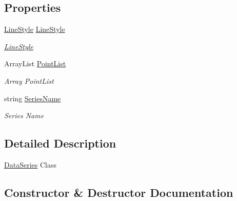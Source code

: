 \subsection*{Properties}
\begin{DoxyCompactItemize}
\item 
\mbox{\hyperlink{class_c_s_i_1_1_library_1_1_plotting_lib_1_1_line_style}{Line\+Style}} \mbox{\hyperlink{class_c_s_i_1_1_library_1_1_plotting_lib_1_1_data_series_aad45f3cd450e9ad86a134f1700a2dc1a}{Line\+Style}}
\begin{DoxyCompactList}\small\item\em \mbox{\hyperlink{class_c_s_i_1_1_library_1_1_plotting_lib_1_1_line_style}{Line\+Style}} \end{DoxyCompactList}\item 
Array\+List \mbox{\hyperlink{class_c_s_i_1_1_library_1_1_plotting_lib_1_1_data_series_a16bc801d66c6e4d327df04933d4f304e}{Point\+List}}
\begin{DoxyCompactList}\small\item\em Array Point\+List \end{DoxyCompactList}\item 
string \mbox{\hyperlink{class_c_s_i_1_1_library_1_1_plotting_lib_1_1_data_series_aafa1978c0fd23c729e0a579f89b0aa78}{Series\+Name}}
\begin{DoxyCompactList}\small\item\em Series Name \end{DoxyCompactList}\end{DoxyCompactItemize}


\subsection{Detailed Description}
\mbox{\hyperlink{class_c_s_i_1_1_library_1_1_plotting_lib_1_1_data_series}{Data\+Series}} Class 



\subsection{Constructor \& Destructor Documentation}
\mbox{\label{class_c_s_i_1_1_library_1_1_plotting_lib_1_1_data_series_ac2bb5e0cf03ad522bf6ac11639aba985}} 
